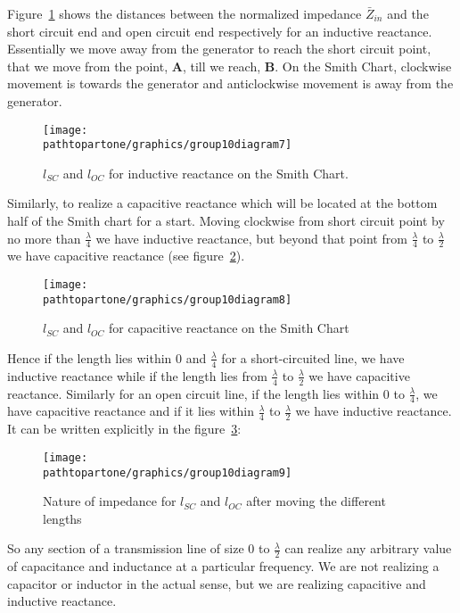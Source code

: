 Figure~\ref{fig:group10diagram7} shows the distances between the normalized impedance $\bar{Z}_{in}$ and the short circuit end and open circuit end respectively for an inductive reactance. Essentially we move away from the generator to reach the short circuit point, that we move from the point, \textbf{A}, till we reach, \textbf{B}. On the Smith Chart, clockwise movement is towards the generator and anticlockwise movement is away from the generator.
\begin{figure}[h]
\centering
\texttt{[image: \\pathtopartone/graphics/group10diagram7]}
\caption{$ l_{SC} $ and $ l_{OC} $ for inductive reactance on the Smith Chart.}
\label{fig:group10diagram7}
\end{figure}

Similarly, to realize a capacitive reactance which will be located at the bottom half of the Smith chart for a start. Moving clockwise from short circuit point by no more than $\frac{\lambda}{4}$ we have inductive reactance, but beyond that point from $\frac{\lambda}{4}$ to $\frac{\lambda}{2}$ we have capacitive reactance (see figure~\ref{fig:group10diagram9}).
\begin{figure}[h]
\centering
\texttt{[image: \\pathtopartone/graphics/group10diagram8]}
\caption{$ l_{SC} $ and $ l_{OC} $ for capacitive reactance on the Smith Chart}
\label{fig:group10diagram9}
\end{figure}

Hence if the length lies within 0 and $ \frac{\lambda}{4} $ for a short-circuited line, we have inductive reactance while if the length lies from $ \frac{\lambda}{4} $ to $ \frac{\lambda}{2} $ we have capacitive reactance. Similarly for an open circuit line, if the length lies within 0 to $ \frac{\lambda}{4} $, we have capacitive reactance and if it lies within $ \frac{\lambda}{4} $ to $ \frac{\lambda}{2} $ we have inductive reactance. It can be written explicitly in the figure~\ref{fig:group10diagram10}:
\begin{figure}[h]
\centering
\texttt{[image: \\pathtopartone/graphics/group10diagram9]}
\caption{Nature of impedance for $ l_{SC} $ and $ l_{OC} $ after moving the different lengths}
\label{fig:group10diagram10}
\end{figure}

So any section of a transmission line of size 0 to $ \frac{\lambda}{2} $ can realize any arbitrary value of capacitance and inductance at a particular frequency. We are not realizing a capacitor or inductor in the actual sense, but we are realizing capacitive and inductive reactance.

